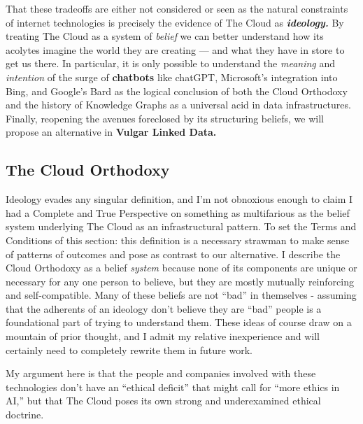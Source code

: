 That these tradeoffs are either not considered or seen as the natural
constraints of internet technologies is precisely the evidence of The
Cloud as \textbf{\emph{ideology.}} By treating The Cloud as a system of
\emph{belief} we can better understand how its acolytes imagine the
world they are creating --- and what they have in store to get us there.
In particular, it is only possible to understand the \emph{meaning} and
\emph{intention} of the surge of \textbf{chatbots} like chatGPT,
Microsoft's integration into Bing, and Google's Bard as the logical
conclusion of both the Cloud Orthodoxy and the history of Knowledge
Graphs as a universal acid in data infrastructures. Finally, reopening
the avenues foreclosed by its structuring beliefs, we will propose an
alternative in \textbf{Vulgar Linked Data.}

\hypertarget{the-cloud-orthodoxy}{%
\subsection{The Cloud Orthodoxy}\label{the-cloud-orthodoxy}}

Ideology evades any singular definition, and I'm not obnoxious enough to
claim I had a Complete and True Perspective on something as
multifarious as the belief system underlying The Cloud as an
infrastructural pattern. To set the Terms and Conditions of this
section: this definition is a necessary strawman to make sense of
patterns of outcomes and pose as contrast to our alternative. I describe
the Cloud Orthodoxy as a belief \emph{system} because none of its
components are unique or necessary for any one person to believe, but
they are mostly mutually reinforcing and self-compatible. Many of these
beliefs are not ``bad'' in themselves - assuming that the adherents of
an ideology don't believe they are ``bad'' people is a foundational part
of trying to understand them. These ideas of course draw on a mountain
of prior thought,
and I admit my relative inexperience and will certainly need to
completely rewrite them in future work.

My argument here is that the people and companies involved with these
technologies don't have an ``ethical deficit'' that might call for
``more ethics in AI,'' but that The Cloud poses its own strong and
underexamined ethical doctrine.

